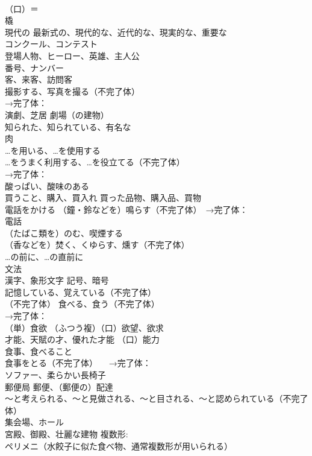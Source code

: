 \documentclass[8pt]{extreport}
\begin{document}
\begin{CJK}{UTF8}{min}
\\	（口）＝
\\	橇
\\	現代の 最新式の、現代的な、近代的な、現実的な、重要な
\\	コンクール、コンテスト
\\	登場人物、ヒーロー、英雄、主人公
\\	番号、ナンバー
\\	客、来客、訪問客
\\	撮影する、写真を撮る（不完了体） 
\\	→完了体：
\\	演劇、芝居 劇場（の建物）
\\	知られた、知られている、有名な
\\	肉
\\	…を用いる、…を使用する 
\\	…をうまく利用する、…を役立てる（不完了体） 
\\	→完了体：
\\	酸っぱい、酸味のある
\\	買うこと、購入、買入れ 買った品物、購入品、買物
\\	電話をかける （鐘・鈴などを）鳴らす（不完了体）　→完了体：
\\	電話
\\	（たばこ類を）のむ、喫煙する 
\\	（香などを）焚く、くゆらす、燻す（不完了体）
\\	…の前に、…の直前に
\\	文法
\\	漢字、象形文字 記号、暗号
\\	記憶している、覚えている（不完了体）
\\	（不完了体）	食べる、食う（不完了体） 
\\	→完了体：
\\	（単）食欲 （ふつう複）（口）欲望、欲求
\\	才能、天賦の才、優れた才能 （口）能力
\\	食事、食べること
\\	食事をとる（不完了体） 　→完了体：
\\	ソファー、柔らかい長椅子
\\	郵便局 郵便、（郵便の）配達
\\	～と考えられる、～と見做される、～と目される、～と認められている（不完了体）
\\	集会場、ホール
\\	宮殿、御殿、壮麗な建物 複数形:
\\	ペリメニ（水餃子に似た食べ物、通常複数形が用いられる）

\end{CJK}
\end{document}

